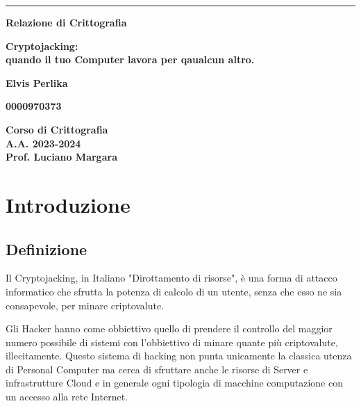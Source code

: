 \documentclass[12pt,a4paper]{article}
\begin{document}
\begin{titlepage}
\begin{center}
\rule[0.5cm]{15.8cm}{0.6mm}
{\small{\bf Relazione di Crittografia }}
\end{center}
\vspace{15mm}
\begin{center}
{\LARGE{\bf Cryptojacking:} \\ 
\vspace{3mm}
{\bf quando il tuo Computer lavora per qaualcun altro.}}
\end{center}
\vspace{35mm}
\par
\noindent
\begin{center}
{\large{\bf Elvis Perlika}}
\end{center}
\begin{center}
{\large{\bf 0000970373}}
\end{center}
\hfill

\vspace{70mm}
\begin{center}
{\large{\bf Corso di Crittografia \\ 
A.A. 2023-2024 \\
Prof. Luciano Margara}}
\end{center}
\end{titlepage}

\newpage

\tableofcontents

\newpage

\section{Introduzione}
\subsection{Definizione}

Il Cryptojacking, in Italiano "Dirottamento di risorse", è una forma di attacco
informatico che sfrutta la potenza di calcolo di un utente, senza che esso ne
sia consapevole, per minare criptovalute. \cite{CSO}

Gli Hacker hanno come obbiettivo quello di prendere il controllo del maggior
numero possibile di sistemi con l'obbiettivo di minare quante più criptovalute,
illecitamente. Questo sistema di hacking non punta unicamente la classica utenza
di Personal Computer ma cerca di sfruttare anche le risorse di Server e
infrastrutture Cloud e in generale ogni tipologia di macchine computazione con un
accesso alla rete Internet.
\end{document}
